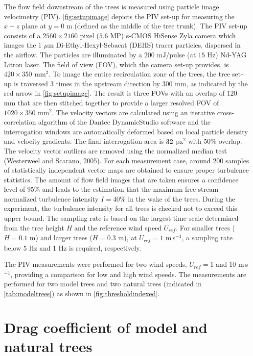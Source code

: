 The flow field downstream of the trees is measured using particle image velocimetry (PIV). \cref{fig:setupimage} depicts the PIV set-up for measuring the $x-z$ plane at $y=0$ m (defined as the middle of the tree trunk). The PIV set-up consists of a $2560 \times 2160$ pixel ($5.6$ MP) s-CMOS HiSense Zyla camera which images the 1 $\mu$m Di-Ethyl-Hexyl-Sebacat (DEHS) tracer particles, dispersed in the airflow. The particles are illuminated by a $200$ mJ/pulse (at $15$ Hz) Nd-YAG Litron laser. The field of view (FOV), which the camera set-up provides, is $420 \times 350$ mm$^2$. To image the entire recirculation zone of the trees, the tree set-up is traversed 3 times in the upstream direction by $300$ mm, as indicated by the red arrow in \cref{fig:setupimage}. The result is three FOVs with an overlap of $120$ mm that are then stitched together to provide a larger resolved FOV of $1020 \times 350$ mm$^2$. The velocity vectors are calculated using an iterative cross-correlation algorithm of the Dantec DynamicStudio software and the interrogation windows are automatically deformed based on local particle density and velocity gradients. The final interrogation area is $32 \time 32$ px$^2$ with $50$\% overlap. The velocity vector outliers are removed using the normalized median test (Westerweel and Scarano, 2005). For each measurement case, around $200$ samples of statistically independent vector maps are obtained to ensure proper turbulence statistics. The amount of flow field images that are taken ensures a confidence level of $95$\% and leads to the estimation that the maximum free-stream normalized turbulence intensity $I=40$\% in the wake of the trees. During the experiment, the turbulence intensity for all trees is checked not to exceed this upper bound. The sampling rate is based on the largest time-scale determined from the tree height $H$ and the reference wind speed $U_{\textit{ref}}$. For smaller trees ($H=0.1$ m) and larger trees ($H=0.3$ m), at $U_{\textit{ref}}=1$ m\,s$^{-1}$, a sampling rate below $5$ Hz and $1$ Hz is required, respectively.

The PIV measurements were performed for two wind speeds, $U_{\textit{ref}}=1$ and $10$ m\,s$^{-1}$, providing a comparison for low and high wind speeds. The measurements are performed for two model trees and two natural trees (indicated in \cref{tab:modeltrees}) as shown in \cref{fig:thresholdindexed}.

\section{Drag coefficient of model and natural trees}

